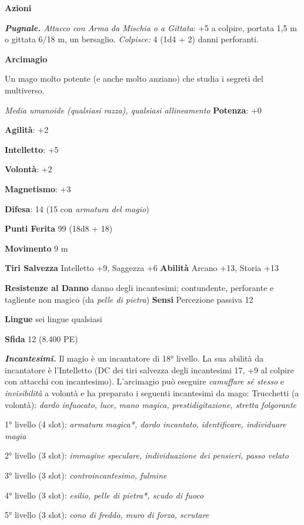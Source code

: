 \begin{multicols}{2}
\textbf{Azioni}

\emph{\textbf{Pugnale.} Attacco con Arma da Mischia o a Gittata}: +5 a
colpire, portata 1,5 m o gittata 6/18 m, un bersaglio. \emph{Colpisce:}
4 (1d4 + 2) danni perforanti.




\textbf{Arcimagio}

Un mago molto potente (e anche molto anziano) che studia i segreti del
multiverso.

\emph{Media umanoide (qualsiasi razza), qualsiasi allineamento}
\textbf{Potenza}: +0

\textbf{Agilità}: +2

\textbf{Intelletto}: +5

\textbf{Volontà}: +2

\textbf{Magnetismo}: +3

\textbf{Difesa}: 14 (15 con \emph{armatura del magio})

\textbf{Punti Ferita} 99 (18d8 + 18)

\textbf{Movimento} 9 m

\textbf{Tiri Salvezza} Intelletto +9, Saggezza +6 \textbf{Abilità}
Arcano +13, Storia +13

\textbf{Resistenze al Danno} danno degli incantesimi; contundente,
perforante e tagliente non magico (da \emph{pelle di pietra})
\textbf{Sensi} Percezione passiva 12

\textbf{Lingue} sei lingue qualsiasi

\textbf{Sfida} 12 (8.400 PE)

\emph{\textbf{Incantesimi.}} Il magio è un incantatore di 18° livello.
La sua abilità da incantatore è l'Intelletto (DC dei tiri salvezza
degli incantesimi 17, +9 al colpire con attacchi con incantesimo).
L'arcimagio può eseguire \emph{camuffare sé stesso} e
\emph{invisibilità} a volontà e ha preparato i seguenti incantesimi da
mago: Trucchetti (a volontà): \emph{dardo infuocato, luce, mano magica,}
\emph{prestidigitazione, stretta folgorante}

1° livello (4 slot): \emph{armatura magica*, dardo incantato,}
\emph{identificare, individuare magia}

2° livello (3 slot): \emph{immagine speculare, individuazione dei}
\emph{pensieri, passo velato}

3° livello (3 slot): \emph{controincantesimo, fulmine}

4° livello (3 slot): \emph{esilio, pelle di pietra*, scudo di fuoco}

5° livello (3 slot): \emph{cono di freddo, muro di forza, scrutare}


\end{multicols}
